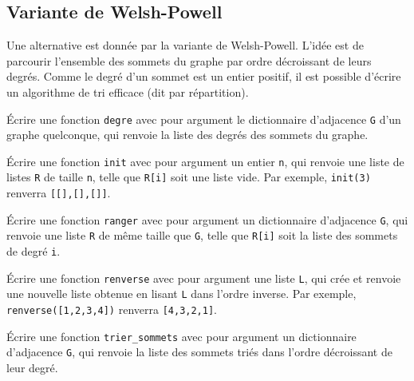 \subsection*{Variante de Welsh-Powell}
Une alternative est donnée par la variante de Welsh-Powell. L’idée est de parcourir l’ensemble des sommets du graphe par ordre décroissant de leurs degrés. Comme le degré d’un sommet est un entier positif, il est possible d’écrire un algorithme de tri efficace (dit par répartition).


\begin{question}
Écrire une fonction \lstinline{degre} avec pour argument le dictionnaire d’adjacence \lstinline{G} d’un graphe quelconque, qui renvoie la liste des degrés des sommets du graphe.
\end{question}

\begin{question}
Écrire une fonction \lstinline{init} avec pour argument un entier \lstinline{n}, qui renvoie une liste de listes \lstinline{R} de taille \lstinline{n}, telle que \lstinline{R[i]} soit une liste vide. Par exemple, \lstinline{init(3)} renverra \lstinline{[[],[],[]]}.
\end{question}

\begin{question}
Écrire une fonction \lstinline{ranger} avec pour argument un dictionnaire d’adjacence \lstinline{G}, qui renvoie une liste \lstinline{R} de même taille que \lstinline{G}, telle que \lstinline{R[i]} soit la liste des sommets de degré \lstinline{i}.
\end{question}


\begin{question}
Écrire une fonction \lstinline{renverse} avec pour argument une liste \lstinline{L}, qui crée et renvoie une nouvelle liste obtenue en lisant \lstinline{L} dans l’ordre inverse. Par exemple, \lstinline{renverse([1,2,3,4])} renverra \lstinline{[4,3,2,1]}.
\end{question}


\begin{question}
Écrire une fonction \lstinline{trier_sommets} avec pour argument un dictionnaire d’adjacence \lstinline{G}, qui renvoie la liste des sommets triés dans l’ordre décroissant de leur degré. 

\end{question}


